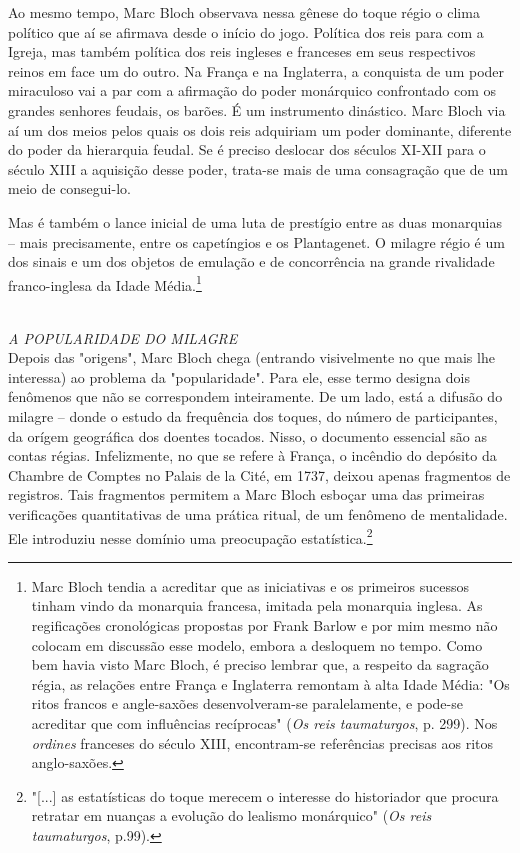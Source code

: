 \documentclass[a5paper]{book}
\begin{document}
Ao mesmo tempo, Marc Bloch observava nessa gênese do toque régio o clima político que aí se af{\kern0pt}irmava desde o início do jogo. Política dos reis para com a Igreja, mas também política dos reis ingleses e franceses em seus respectivos reinos em face um do outro. Na França e na Inglaterra, a conquista de um poder miraculoso vai a par com a af{\kern0pt}irmação do poder monárquico confrontado com os grandes senhores feudais, os barões. É um instrumento dinástico. Marc Bloch via aí um dos meios pelos quais os dois reis adquiriam um poder dominante, diferente do poder da hierarquia feudal. Se é preciso deslocar dos séculos XI-XII para o século XIII a aquisição desse poder, trata-se mais de uma consagração que de um meio de consegui-lo.

Mas é também o lance inicial de uma luta de prestígio entre as duas monarquias -- mais precisamente, entre os capetíngios e os Plantagenet. O milagre régio é um dos sinais e um dos objetos de emulação e de concorrência na grande rivalidade franco-inglesa da Idade Média.\footnote{Marc Bloch tendia a acreditar que as iniciativas e os primeiros sucessos tinham vindo da monarquia francesa, imitada pela monarquia inglesa. As regif{\kern0pt}icações cronológicas propostas por Frank Barlow e por mim mesmo não colocam em discussão esse modelo, embora a desloquem no tempo. Como bem havia visto Marc Bloch, é preciso lembrar que, a respeito da sagração régia, as relações entre França e Inglaterra remontam à alta Idade Média: "Os ritos francos e angle-saxões desenvolveram-se paralelamente, e pode-se acreditar que com inf{\kern0pt}luências recíprocas" (\textit{Os reis taumaturgos}, p. 299). Nos \textit{ordines} franceses do século XIII, encontram-se referências precisas aos ritos anglo-saxões.}

~\\ \large \textit{A POPULARIDADE DO MILAGRE} ~\\

Depois das "origens", Marc Bloch chega (entrando visivelmente no que mais lhe interessa) ao problema da "popularidade". Para ele, esse termo designa dois fenômenos que não se correspondem inteiramente. De um lado, está a difusão do milagre -- donde o estudo da frequência dos toques, do número de participantes, da orígem geográf{\kern0pt}ica dos doentes tocados. Nisso, o documento essencial são as contas régias. Infelizmente, no que se refere à França, o incêndio do depósito da Chambre de Comptes no Palais de la Cité, em  1737, deixou apenas fragmentos de registros. Tais fragmentos permitem a Marc Bloch esboçar uma das primeiras verif{\kern0pt}icações quantitativas de uma prática ritual, de um fenômeno de mentalidade. Ele introduziu nesse domínio uma preocupação estatística.\footnote{"[...] as estatísticas do toque merecem o interesse do historiador que procura retratar em nuanças a evolução do lealismo monárquico" (\textit{Os reis taumaturgos}, p.99).}
\end{document}
